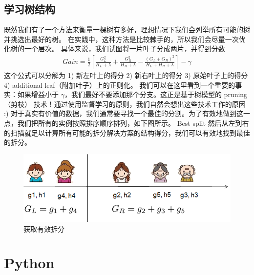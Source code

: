 \documentclass{article}
\begin{document}
\subsection{学习树结构}
既然我们有了一个方法来衡量一棵树有多好，理想情况下我们会列举所有可能的树并挑选出最好的树。 在实践中，这种方法是比较棘手的，所以我们会尽量一次优化树的一个层次。 具体来说，我们试图将一片叶子分成两片，并得到分数
\begin{equation*}
	\begin{split}
		Gain=\frac{1}{2}[\frac{G_L^2}{H_L+\lambda}+\frac{G_R^2}{H_R+\lambda}-\frac{(G_L+G_R)^2}{H_L+H_R+\lambda}]-\gamma 
	\end{split}
\end{equation*}
这个公式可以分解为 1) 新左叶上的得分 2) 新右叶上的得分 3) 原始叶子上的得分 4) additional leaf（附加叶子）上的正则化。 我们可以在这里看到一个重要的事实：如果增益小于 $\gamma$，我们最好不要添加那个分支。这正是基于树模型的 pruning（剪枝） 技术！通过使用监督学习的原则，我们自然会想出这些技术工作的原因 :)
对于真实有价值的数据，我们通常要寻找一个最佳的分割。为了有效地做到这一点，我们把所有的实例按照排序顺序排列，如下图所示。 Best split
然后从左到右的扫描就足以计算所有可能的拆分解决方案的结构得分，我们可以有效地找到最佳的拆分。
\begin{figure}[H]
	\centering
	\includegraphics[scale=0.5]{split_find.png}
	\caption{获取有效拆分}
\end{figure}
\section{Python}
\end{document}
